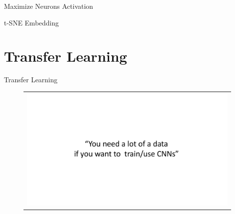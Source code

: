\documentclass[aspectratio=169]{beamer}
\begin{document}

\begin{frame}{Maximize Neurons Activation}

\end{frame}


\begin{frame}{t-SNE Embedding}

\end{frame}


\section{Transfer Learning}


\begin{frame}{Transfer Learning}
\vspace{-1cm}
\begin{figure}
\begin{tabular}{c}
\includegraphics[width=\textwidth]{img/cnn/busted_0.pdf}
\end{tabular}
\end{figure}
\end{frame}
\end{document}

